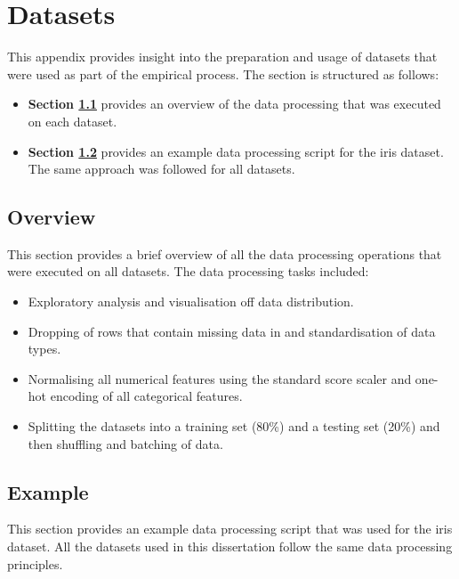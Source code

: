 \chapter{Datasets}
\label{app:datasets}

This appendix provides insight into the preparation and usage of datasets that were used as part of the empirical process. The section is structured as follows:

\begin{itemize}
	\item \textbf{Section \ref{app:datasets:overview}} provides an overview of the data processing that was executed on each dataset.

	\item \textbf{Section \ref{app:datasets:example}} provides an example data processing script for the iris dataset. The same approach was followed for all datasets.
\end{itemize}

\section{Overview}\label{app:datasets:overview}

This section provides a brief overview of all the data processing operations that were executed on all datasets. The data processing tasks included:

\begin{itemize}
	\item Exploratory analysis and visualisation off data distribution.

	\item Dropping of rows that contain missing data in and standardisation of data types.

	\item Normalising all numerical features using the standard score scaler and one-hot encoding of all categorical features.

	\item Splitting the datasets into a training set (80\%) and a testing set (20\%) and then shuffling and batching of data.
\end{itemize}


\section{Example}\label{app:datasets:example}

This section provides an example data processing script that was used for the iris dataset. All the datasets used in this dissertation follow the same data processing principles.


